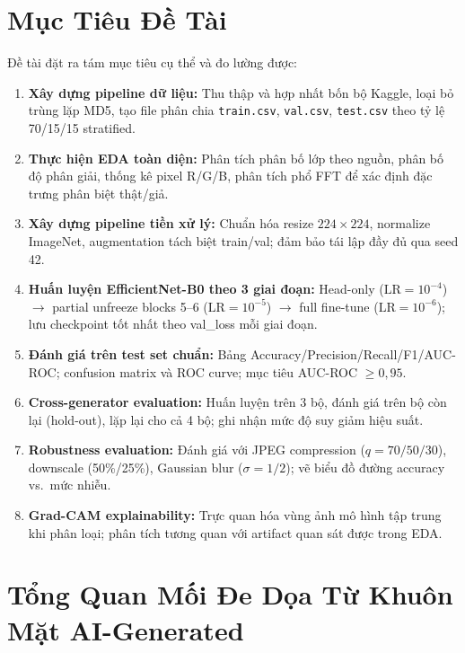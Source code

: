 \section{Mục Tiêu Đề Tài}

Đề tài đặt ra tám mục tiêu cụ thể và đo lường được:

\begin{enumerate}
  \item \textbf{Xây dựng pipeline dữ liệu:} Thu thập và hợp nhất bốn bộ Kaggle, loại bỏ trùng lặp MD5, tạo file phân chia \texttt{train.csv}, \texttt{val.csv}, \texttt{test.csv} theo tỷ lệ 70/15/15 stratified.

  \item \textbf{Thực hiện EDA toàn diện:} Phân tích phân bố lớp theo nguồn, phân bố độ phân giải, thống kê pixel R/G/B, phân tích phổ FFT để xác định đặc trưng phân biệt thật/giả.

  \item \textbf{Xây dựng pipeline tiền xử lý:} Chuẩn hóa resize $224 \times 224$, normalize ImageNet, augmentation tách biệt train/val; đảm bảo tái lập đầy đủ qua seed 42.

  \item \textbf{Huấn luyện EfficientNet-B0 theo 3 giai đoạn:} Head-only ($\text{LR}=10^{-4}$) $\to$ partial unfreeze blocks 5--6 ($\text{LR}=10^{-5}$) $\to$ full fine-tune ($\text{LR}=10^{-6}$); lưu checkpoint tốt nhất theo val\_loss mỗi giai đoạn.

  \item \textbf{Đánh giá trên test set chuẩn:} Bảng Accuracy/Precision/Recall/F1/AUC-ROC; confusion matrix và ROC curve; mục tiêu AUC-ROC $\geq 0{,}95$.

  \item \textbf{Cross-generator evaluation:} Huấn luyện trên 3 bộ, đánh giá trên bộ còn lại (hold-out), lặp lại cho cả 4 bộ; ghi nhận mức độ suy giảm hiệu suất.

  \item \textbf{Robustness evaluation:} Đánh giá với JPEG compression ($q = 70/50/30$), downscale (50\%/25\%), Gaussian blur ($\sigma = 1/2$); vẽ biểu đồ đường accuracy vs.\ mức nhiễu.

  \item \textbf{Grad-CAM explainability:} Trực quan hóa vùng ảnh mô hình tập trung khi phân loại; phân tích tương quan với artifact quan sát được trong EDA.
\end{enumerate}

\section{Tổng Quan Mối Đe Dọa Từ Khuôn Mặt AI-Generated}

